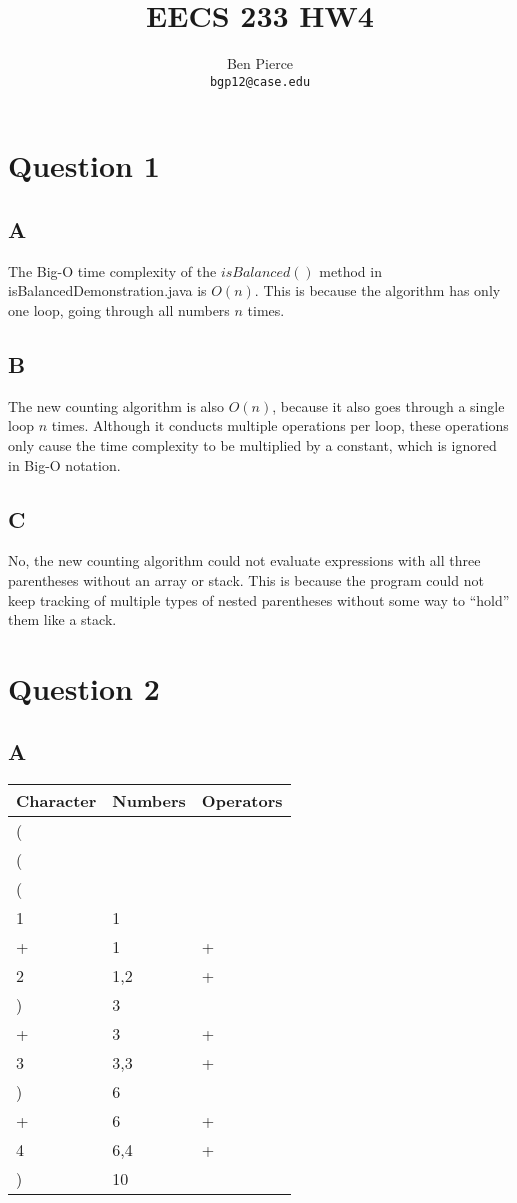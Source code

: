 \documentclass[12pt]{article} %
\title{EECS 233 HW4}
\author{Ben Pierce \\ \texttt{bgp12@case.edu}}
\begin{document}
\maketitle
\section{Question 1}
\subsection{A}
The Big-O time complexity of the $isBalanced()$ method in isBalancedDemonstration.java is $O(n)$. This is because the algorithm has only one loop, going through all numbers $n$ times.
\subsection{B}
The new counting algorithm is also $O(n)$, because it also goes through a single loop $n$ times. Although it conducts multiple operations per loop, these operations only cause the time complexity to be multiplied by a constant, which is ignored in Big-O notation. 
\subsection{C}
No, the new counting algorithm could not evaluate expressions with all three parentheses without an array or stack. This is because the program could not keep tracking of multiple types of nested parentheses without some way to “hold” them like a stack.

\section{Question 2}
\subsection{A}
\begin{tabular}{ | l | l | l |}
\hline
Character & Numbers & Operators  \\ \hline
( & & \\ \hline
( & &\\ \hline
( & &\\ \hline
1 & 1 & \\ \hline
+ & 1 & + \\ \hline
2 & 1,2 & + \\ \hline
) & 3 & \\ \hline
+ & 3 & + \\ \hline
3 & 3,3 & + \\ \hline
) & 6 & \\ \hline
+ & 6 & + \\ \hline
4 & 6,4 & + \\ \hline
) & 10 & \\ \hline
\end{tabular}
\end{document}
